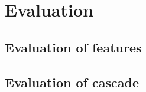 \chapter{Evaluation}
\label{sec:Evaluation}

\section{Evaluation of features}
\label{sec:Evaluation of features}

\section{Evaluation of cascade}
\label{sec:Evalutaion of cascade}


